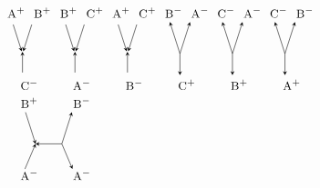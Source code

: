 \documentclass{llncs}
\begin{document}
\begin{figure}
\[
\begin{tikzpicture}[
every node/.style={anchor=base},xscale=.725,yscale=1,
-->/.style={->,shorten >=2pt,shorten <=2pt,>=stealth},
<--/.style={<-,shorten >=2pt,shorten <=2pt,>=stealth},
--->/.style={->,shorten >=1pt,shorten <=1pt,>=stealth},
<---/.style={<-,>=stealth},
]
\node (i1) at (0,0) {$\textsc{\small A}^+$};
\node (ii1) at (1,0) {$\textsc{\small B}^+$};
\node (d1) at (.5,-1) {};
\node (o1) at (.5,-2) {$\textsc{\small C}^-$};
\draw[-->] (i1) -- (d1.center);
\draw[-->] (ii1) -- (d1.center);
\draw[<--] (d1.north) -- (o1);

\node (i2) at (2,0) {$\textsc{\small B}^+$};
\node (ii2) at (3,0) {$\textsc{\small C}^+$};
\node (d2) at (2.5,-1) {};
\node (o2) at (2.5,-2) {$\textsc{\small A}^-$};
\draw[-->] (i2) -- (d2.center);
\draw[-->] (ii2) -- (d2.center);
\draw[<--] (d2.north) -- (o2);

\node (i3) at (4,0) {$\textsc{\small A}^+$};
\node (ii3) at (5,0) {$\textsc{\small C}^+$};
\node (d3) at (4.5,-1) {};
\node (o3) at (4.5,-2) {$\textsc{\small B}^-$};
\draw[-->] (i3) -- (d3.center);
\draw[-->] (ii3) -- (d3.center);
\draw[<--] (d3.north) -- (o3);

\node (i4) at (6,0) {$\textsc{\small B}^-$};
\node (ii4) at (7,0) {$\textsc{\small A}^-$};
\node (d4) at (6.5,-1) {};
\node (o4) at (6.5,-2) {$\textsc{\small C}^+$};
\draw[<-,>=stealth] (i4) -- (d4.center);
\draw[<-,>=stealth] (ii4) -- (d4.center);
\draw[->,>=stealth] (d4.center) -- (o4);

\node (i5) at (8,0) {$\textsc{\small C}^-$};
\node (ii5) at (9,0) {$\textsc{\small A}^-$};
\node (d5) at (8.5,-1) {};
\node (o5) at (8.5,-2) {$\textsc{\small B}^+$};
\draw[<-,>=stealth] (i5) -- (d5.center);
\draw[<-,>=stealth] (ii5) -- (d5.center);
\draw[->,>=stealth] (d5.center) -- (o5);

\node (i6) at (10,0) {$\textsc{\small C}^-$};
\node (ii6) at (11,0) {$\textsc{\small B}^-$};
\node (d6) at (10.5,-1) {};
\node (o6) at (10.5,-2) {$\textsc{\small A}^+$};
\draw[<-,>=stealth] (i6) -- (d6.center);
\draw[<-,>=stealth] (ii6) -- (d6.center);
\draw[->,>=stealth] (d6.center) -- (o6);

\node (i21) at (.5,-2.5) {$\textsc{\small B}^+$};
\node (ii21) at (2.5,-2.5) {$\textsc{\small B}^-$};
\node (d21) at (1,-3.5) {};
\node (dd21) at (2,-3.5) {};
\node (o21) at (.5,-4.5) {$\textsc{\small A}^-$};
\node (oo21) at (2.5,-4.5) {$\textsc{\small A}^-$};
\draw[->,>=stealth] (i21) -- (d21.center);
\draw[<-,>=stealth] (ii21) -- (dd21.center);
\draw[<-,>=stealth] (d21.center) -- (dd21.center);
\draw[<-,>=stealth, shorten >=5pt] (d21.center) -- (o21.center);
\draw[->,>=stealth, shorten >=5pt] (dd21.center) -- (oo21.center);


\end{tikzpicture}\]
\end{figure}
\end{document}

